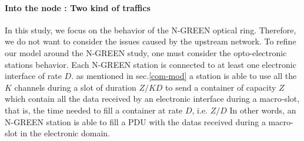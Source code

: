 \documentclass[a4paper,10pt,english]{article}
\begin{document}
%
%  

\paragraph{Into the node : Two kind of traffics}
  In this study, we focus on the behavior of the N-GREEN optical ring. Therefore, we do not want to consider the issues caused by the upstream network. 
   To refine our model around the N-GREEN study, one must consider the opto-electronic stations behavior.
   Each N-GREEN station is connected to at least one electronic interface of rate $D$. as mentioned in sec.\ref{com-mod} a station is able to use all the $K$ channels during a slot of duration $Z/KD$ to send a container of capacity $Z$ which contain all the data received  by an electronic interface during a macro-slot, that is, the time needed to fill a container at rate $D$, i.e. $Z/D$
  In other words, an N-GREEN station is able to fill a PDU with the datas received during a macro-slot in the electronic domain. 
    
\end{document}
